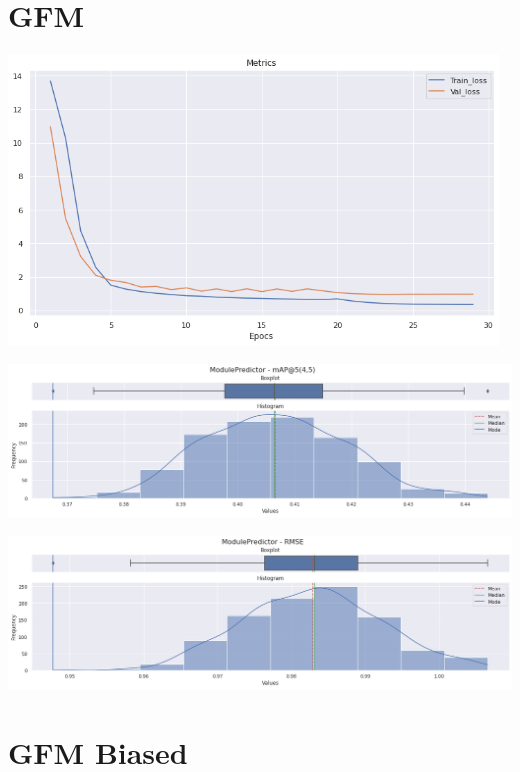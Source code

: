 \documentclass[11pt,a4paper,twoside]{thesis}
\begin{document}
\section{GFM}

\begin{center}
	\includegraphics[width=13cm]{./images/metrics-GFM-train-val-loss.png}
\end{center}

\begin{center}
	\includegraphics[width=16cm]{./images/metrics-GFM-mapk.png}
\end{center}


\begin{center}
	\includegraphics[width=16cm]{./images/metrics-GFM-RMSE.png}
\end{center}



\section{GFM Biased}
\end{document}
